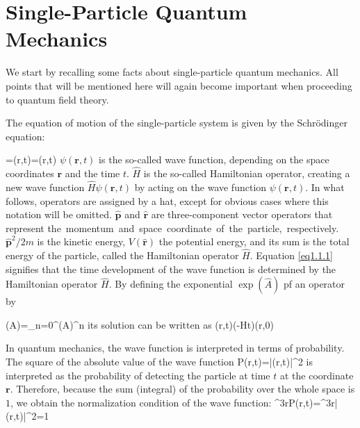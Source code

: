 
\section{Single-Particle Quantum Mechanics}

We start by recalling some facts about single-particle quantum mechanics. All points that will be mentioned here will again become important when proceeding to quantum field theory. 

The equation of motion of the single-particle system is given by the\!\! {\color{white}{\-}}Schrödinger equation:

\be\label{eq1.1.1}
\ii\hbar{}=\psi({\bm r},t)=\psi({\bm r},t)
\ee
$\psi({\bm r},t)$ is the so-called wave function, depending on the space coordinates $\bm r$ and the time $t$. $\hat H$ is the so-called Hamiltonian operator, creating a new wave function $\hat H\psi({\bm r},t)$ by acting on the wave function $\psi({\bm r},t)$. In what follows, operators are assigned by a hat, except for obvious cases where this notation will be omitted. $\hat{\bm p}$ and $\hat{\bm r}$ are three-component vector operators that represent the \,momentum \,and \,space \,coordinate \,of \,the \,particle, \,respectively. ${\hat{\bm p}}^2/2m$ \-
is the kinetic energy, $V(\hat{\bm r})$ the potential energy, and its sum is the total energy of the particle, called the Hamiltonian operator $\hat H$. Equation \eqref{eq1.1.1} signifies that the time development of the wave function is determined by the Hamiltonian operator $\hat H$. By defining the exponential $\exp(\hat A)$ pf an operator by

\be\label{eq1.1.2}
\exp(\hat A)=\sum_{n=0}^\infty {}(\hat A)^n
\ee
its solution can be written as
\be\label{eq1.1.3}
\psi({\bm r},t)\exp\left(-\hat Ht\right)\psi({\bm r},0)
\ee

In quantum mechanics, the wave function is interpreted in terms of probability. The square of the absolute value of the wave function
\be
P({\bm r},t)=|\psi({\bm r},t)|^2
\ee
is interpreted as the probability of detecting the particle at time $t$ at the coordinate $\bm r$. Therefore, because the sum (integral) of the probability over the whole space is $1$, we obtain the normalization condition of the wave function:
\be
\int\dd^3{\bm r}P({\bm r},t)=\int\dd^3{\bm r}|\psi({\bm r},t)|^2=1
\ee

